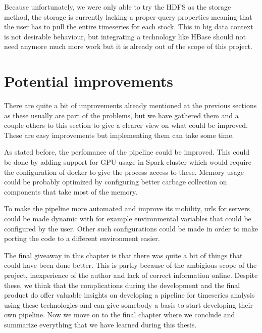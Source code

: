 Because unfortunately, we were only able to try the HDFS as the storage method, the storage is currently lacking a proper query properties meaning that the user has to pull the entire timeseries for each stock.
This in big data context is not desirable behaviour, but integrating a technology like HBase should not need anymore much more work but it is already out of the scope of this project.

\section{Potential improvements}

There are quite a bit of improvements already mentioned at the previous sections as these usually are part of the problems, but we have gathered them and a couple others to this section to give a clearer view on what could be improved.
These are easy improvements but implementing them can take some time.

As stated before, the perfomance of the pipeline could be improved.
This could be done by adding support for GPU usage in Spark cluster which would require the configuration of docker to give the process access to these.
Memory usage could be probably optimized by configuring better carbage collection on components that take most of the memory.

To make the pipeline more automated and improve its mobility, urls for servers could be made dynamic with for example environmental variables that could be configured by the user.
Other such configurations could be made in order to make porting the code to a different environment easier.

The final giveaway in this chapter is that there was quite a bit of things that could have been done better. 
This is partly because of the ambigious scope of the project, inexperience of the author and lack of correct information online.
Despite these, we think that the complications during the development and the final product do offer valuable insights on developing a pipeline for timeseries analysis using these technologies and can give somebody a basis to start developing their own pipeline.
Now we move on to the final chapter where we conclude and summarize everything that we have learned during this thesis.